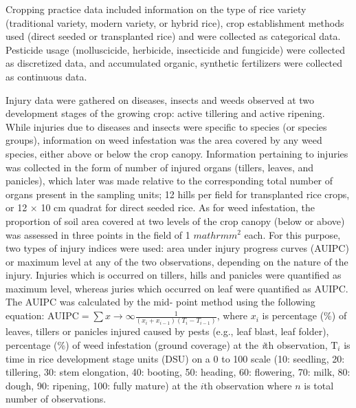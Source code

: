 Cropping practice data included information on the type of rice variety (traditional variety, modern variety, or hybrid rice), crop establishment methods used (direct seeded or transplanted rice) and were collected as categorical data. Pesticide usage (molluscicide, herbicide, insecticide and fungicide) were collected as discretized data, and accumulated organic, synthetic fertilizers were collected as continuous data.

Injury data were gathered on diseases, insects and weeds observed at two development stages of the growing crop: active tillering and active ripening. While injuries due to diseases and insects were specific to species (or species groups), information on weed infestation was the area covered by any weed species, either above or below the crop canopy. Information pertaining to injuries was collected in the form of number of injured organs (tillers, leaves, and panicles), which later was made relative to the corresponding total number of organs present in the sampling units; 12 hills per field for transplanted rice crops, or 12 $\times$ 10 cm quadrat for direct seeded rice. As for weed infestation, the proportion of soil area covered at two levels of the crop canopy (below or above) was assessed in three points in the field of 1 $mathrm{m}^{2}$ each. For this purpose, two types of injury indices were used: area under injury progress curves (AUIPC) or maximum level at any of the two observations, depending on the nature of the injury. Injuries which is occurred on tillers, hills and panicles were quantified as maximum level, whereas juries which occurred on leaf were quantified as AUIPC. The AUIPC was calculated by the mid- point method using the following equation: $\mathrm{AUIPC} = \sum{x\to\infty}\frac{1}{(x_{i} + x_{i-1})(T_{i} - T_{i-1})}$, where $x_i$ is percentage (\%) of leaves, tillers or panicles injured caused by pests (e.g., leaf blast, leaf folder), percentage (\%) of weed infestation (ground coverage) at the \textit{i}th observation, $\mathrm{T}_{i}$ is time in rice development stage units (DSU) on a 0 to 100 scale (10: seedling, 20: tillering, 30: stem elongation, 40: booting, 50: heading, 60: flowering, 70: milk, 80: dough, 90: ripening, 100: fully mature) at the $i$th observation where $n$ is total number of observations.


